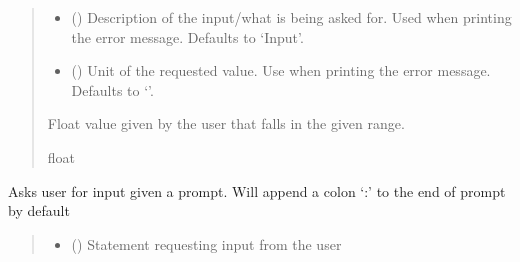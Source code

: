 \documentclass[letterpaper,10pt,english]{sphinxmanual}
\begin{document}
\begin{fulllineitems}
\begin{fulllineitems}
\begin{quote}
\begin{description}
\begin{itemize}
\item {} 
\sphinxAtStartPar
{} (\sphinxstyleliteralemphasis{\sphinxupquote{, }}) \textendash{} Description of the input/what is being asked for. Used when printing                 the error message. Defaults to ‘Input’.

\item {} 
\sphinxAtStartPar
{} (\sphinxstyleliteralemphasis{\sphinxupquote{, }}) \textendash{} Unit of the requested value. Use when printing the error message.                 Defaults to ‘’.

\end{itemize}

\sphinxAtStartPar
Float value given by the user that falls in the given range.

\sphinxAtStartPar
float

\end{description}\end{quote}

\end{fulllineitems}


\begin{fulllineitems}
\label{\detokenize{GetUserInput:GetUserInput.UserInput.AskForInput}}
\pysigstartsignatures
{}
\pysigstopsignatures
\sphinxAtStartPar
Asks user for input given a prompt. Will append a colon ‘:’ to the end of prompt by default
\begin{quote}\begin{description}
\begin{itemize}
\item {} 
\sphinxAtStartPar
{} () \textendash{} Statement requesting input from the user


\end{itemize}
\end{description}
\end{quote}
\end{fulllineitems}
\end{fulllineitems}
\end{document}
